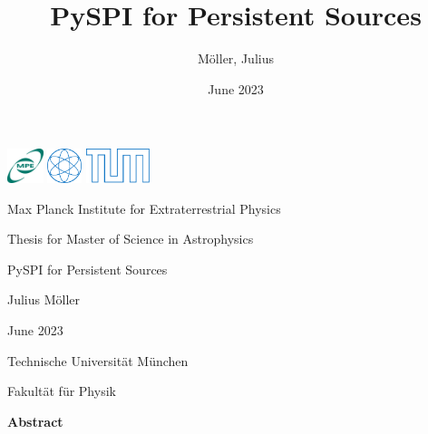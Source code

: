 \documentclass{report}
\title{PySPI for Persistent Sources}
\author{Möller, Julius}
\date{June 2023}
\begin{document}
\begin{titlepage}
    
    \includegraphics[height=1cm]{Images/General/MPE_logo_189x180px.jpg}
    \hfill
    \includegraphics[height=1cm]{Images/General/PH.pdf}
    \includegraphics[height=1cm]{Images/General/tumlogo.pdf}

    \begin{center}
        \vspace{1cm}
        \large

        Max Planck Institute for Extraterrestrial Physics
        

        \vspace{1.5cm}
        \large
        Thesis for Master of Science in Astrophysics
        
        \vspace{3cm}
        \Huge
        PySPI for Persistent Sources
        
        \vspace{3cm}
        
        \LARGE
        Julius Möller
        
        \vspace{1.5cm}
        \large
        June 2023
        
        
        \vspace{6.5cm}
        
        
        
        \large
        Technische Universität München

        Fakultät für Physik
        
        
        
    \end{center}
\end{titlepage}

\thispagestyle{plain}


\vspace*{6cm}
\LARGE
\textbf{Abstract}
\newline
\end{document}
